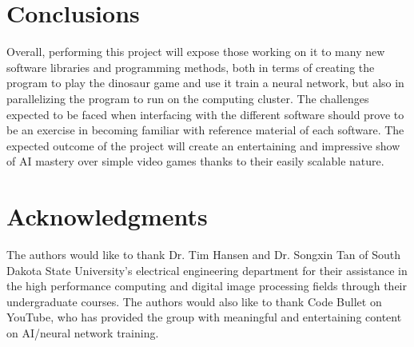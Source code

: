 

\section{Conclusions}\label{sec:conc}

Overall, performing this project will expose those working on it to many new software libraries and programming methods, both in terms of creating the program to play the dinosaur game and use it train a neural network, but also in parallelizing the program to run on the computing cluster. The challenges expected to be faced when interfacing with the different software should prove to be an exercise in becoming familiar with reference material of each software. The expected outcome of the project will create an entertaining and impressive show of AI mastery over simple video games thanks to their easily scalable nature.%


\section*{Acknowledgments}
The authors would like to thank Dr. Tim Hansen and Dr. Songxin Tan of South Dakota State University's electrical engineering department for their assistance in the high performance computing and digital image processing fields through their undergraduate courses. The authors would also like to thank Code Bullet on YouTube, who has provided the group with meaningful and entertaining content on AI/neural network training.


 




